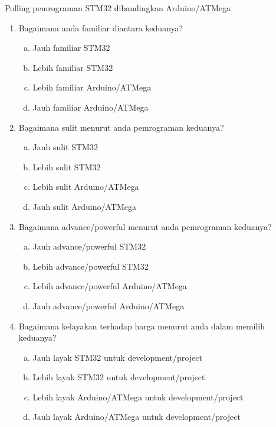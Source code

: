 \documentclass[12pt,]{article}
\date{}
\begin{document}
	\linespread{1}
	
	\thispagestyle{empty}
	\pagestyle{empty}
	
	Polling pemrograman STM32 dibandingkan Arduino/ATMega
	
	\begin{enumerate}
		\item Bagaimana anda familiar diantara keduanya?
		\begin{enumerate}[(a)]
			\item Jauh familiar STM32
			\item Lebih familiar STM32
			\item Lebih familiar Arduino/ATMega
			\item Jauh familiar Arduino/ATMega
		\end{enumerate}
	
		\item Bagaimana sulit menurut anda pemrograman keduanya?
		\begin{enumerate}[(a)]
			\item Jauh sulit STM32
			\item Lebih sulit STM32
			\item Lebih sulit Arduino/ATMega
			\item Jauh sulit Arduino/ATMega
		\end{enumerate}
	
		\item Bagaimana advance/powerful menurut anda pemrograman keduanya?
		\begin{enumerate}[(a)]
			\item Jauh advance/powerful STM32
			\item Lebih advance/powerful STM32
			\item Lebih advance/powerful Arduino/ATMega
			\item Jauh advance/powerful Arduino/ATMega
		\end{enumerate}
	
		\item Bagaimana kelayakan terhadap harga menurut anda dalam memilih keduanya?
		\begin{enumerate}[(a)]
			\item Jauh layak STM32 untuk development/project
			\item Lebih layak STM32 untuk development/project
			\item Lebih layak Arduino/ATMega untuk development/project
			\item Jauh layak Arduino/ATMega untuk development/project
		\end{enumerate}
	

\end{enumerate}
\end{document}
